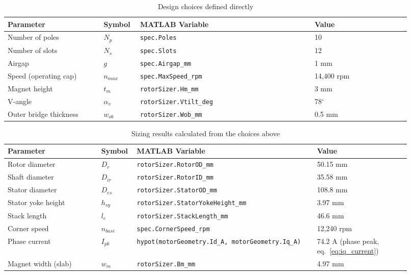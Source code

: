 \documentclass[10pt,final,journal,a4paper,oneside,twocolumn]{IEEEtran}
\begin{document}
\begin{table}[!t]
\centering
\footnotesize
\caption{Design choices defined directly}
\label{tab:params_defined}
\begin{tabular}{@{}L{0.22\linewidth}p{0.08\linewidth}L{0.40\linewidth}L{0.22\linewidth}@{}}
\toprule
\textbf{Parameter} & \textbf{Symbol} & \textbf{MATLAB Variable} & \textbf{Value} \\
\midrule
Number of poles & $N_p$ & \texttt{spec.Poles} & 10 \\
Number of slots & $N_s$ & \texttt{spec.Slots} & 12 \\
Airgap & $g$ & \texttt{spec.Airgap\_mm} & 1 mm \\
Speed (operating cap) & $n_{max}$ & \texttt{spec.MaxSpeed\_rpm} & 14,400 rpm \\
Magnet height & $t_m$ & \texttt{rotorSizer.Hm\_mm} & 3 mm \\
V-angle & $\alpha_v$ & \texttt{rotorSizer.Vtilt\_deg} & 78$^\circ$\\
Outer bridge thickness & $w_{ob}$ & \texttt{rotorSizer.Wob\_mm} & 0.5 mm \\
\bottomrule
\end{tabular}
\end{table}

\begin{table}[!t]
\centering
\footnotesize
\caption{Sizing results calculated from the choices above}
\label{tab:params_calculated}
\begin{tabular}{@{}L{0.22\linewidth}p{0.08\linewidth}L{0.40\linewidth}L{0.22\linewidth}@{}}
\toprule
\textbf{Parameter} & \textbf{Symbol} & \textbf{MATLAB Variable} & \textbf{Value} \\
\midrule
Rotor diameter & $D_r$ & \texttt{rotorSizer.RotorOD\_mm} & 50.15 mm \\
Shaft diameter & $D_{ir}$ & \texttt{rotorSizer.RotorID\_mm} & 35.58 mm \\
Stator diameter & $D_{es}$ & \texttt{rotorSizer.StatorOD\_mm} & 108.8 mm \\
Stator yoke height & $h_{sy}$ & \texttt{rotorSizer.StatorYoke\-Height\_mm} & 3.97 mm \\
Stack length & $l_e$ & \texttt{rotorSizer.StackLength\_mm} & 46.6 mm \\
Corner speed & $n_{base}$ & \texttt{spec.CornerSpeed\_rpm} & 12,240 rpm \\
Phase current & $I_{pk}$ & \texttt{hypot(motorGeometry.Id\_A,\allowbreak\ motorGeometry.Iq\_A)} & 74.2 A (phase peak, eq.~\ref{eq:iq_current}) \\
Magnet width (slab) & $w_m$ & \texttt{rotorSizer.Bm\_mm} & 4.97 mm \\
\bottomrule
\end{tabular}
\end{table}
\end{document}
